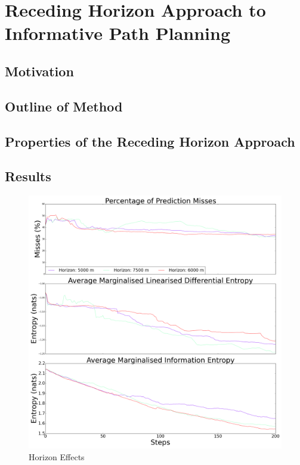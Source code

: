 \documentclass{article}
\begin{document}
		

					
\section{Receding Horizon Approach to Informative Path Planning}
\label{Section:RecedingHorizonApproach}

	\subsection{Motivation}
	
	\subsection{Outline of Method}
	
	\subsection{Properties of the Receding Horizon Approach}
	
	\subsection{Results}
		\begin{figure}[!htbp]
		\centering
			\includegraphics[width = \linewidth]{Figures/compare_horizons.png}
		\caption{Horizon Effects}
		\label{Figure:Results:CompareHorizons}
		\end{figure}
	
\end{document}
